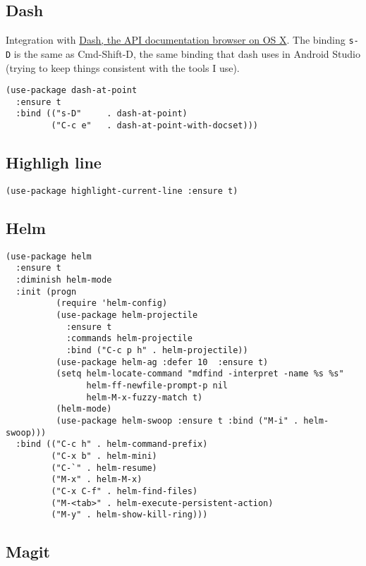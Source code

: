 \documentclass[11pt]{article}
\begin{document}
\subsection{Dash}
\label{sec-18-7}

Integration with \href{http://kapeli.com/dash}{Dash, the API documentation browser on OS X}. The
binding \verb~s-D~ is the same as Cmd-Shift-D, the same binding that dash
uses in Android Studio (trying to keep things consistent with the
tools I use).

\begin{verbatim}
(use-package dash-at-point
  :ensure t
  :bind (("s-D"     . dash-at-point)
         ("C-c e"   . dash-at-point-with-docset)))
\end{verbatim}

\subsection{Highligh line}
\label{sec-18-8}

\begin{verbatim}
(use-package highlight-current-line :ensure t)
\end{verbatim}
\subsection{Helm}
\label{sec-18-9}

\begin{verbatim}
(use-package helm
  :ensure t
  :diminish helm-mode
  :init (progn
          (require 'helm-config)
          (use-package helm-projectile
            :ensure t
            :commands helm-projectile
            :bind ("C-c p h" . helm-projectile))
          (use-package helm-ag :defer 10  :ensure t)
          (setq helm-locate-command "mdfind -interpret -name %s %s"
                helm-ff-newfile-prompt-p nil
                helm-M-x-fuzzy-match t)
          (helm-mode)
          (use-package helm-swoop :ensure t :bind ("M-i" . helm-swoop)))
  :bind (("C-c h" . helm-command-prefix)
         ("C-x b" . helm-mini)
         ("C-`" . helm-resume)
         ("M-x" . helm-M-x)
         ("C-x C-f" . helm-find-files)
         ("M-<tab>" . helm-execute-persistent-action)
         ("M-y" . helm-show-kill-ring)))
\end{verbatim}

\subsection{Magit}
\label{sec-18-10}
\end{document}
